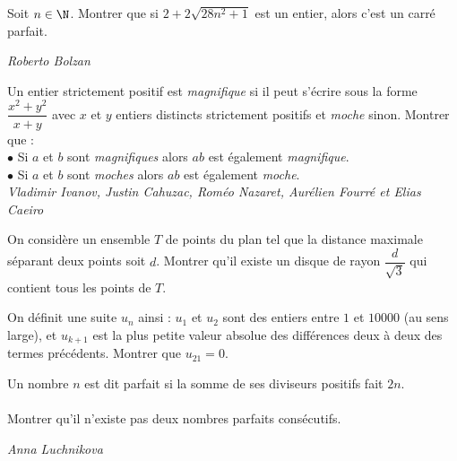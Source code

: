 \begin{exo}{}
Soit $n \in \N$. Montrer que si $2+2\sqrt{28n^2+1}$ est un entier, alors c'est un carré parfait.

\medskip
\textit{Roberto Bolzan}
\end{exo}



\begin{exo}{}
Un entier strictement positif est \textit{magnifique} si il peut s'écrire sous la forme $\dfrac{x^2+y^2}{x+y}$ avec $x$ et $y$ entiers distincts strictement positifs et \textit{moche} sinon. Montrer que :\\
$\bullet$ Si $a$ et $b$ sont \textit{magnifiques} alors $ab$ est également \textit{magnifique}.\\
$\bullet$ Si $a$ et $b$ sont \textit{moches} alors $ab$ est également \textit{moche}.\\

\medskip
\textit{Vladimir Ivanov, Justin Cahuzac, Roméo Nazaret, Aurélien Fourré et Elias Caeiro}

\end{exo}



\begin{exo}{}
On considère un ensemble $T$ de points du plan tel que la distance maximale séparant deux points soit $d$. Montrer qu'il existe un disque de rayon $\dfrac{d}{\sqrt{3}}$ qui contient tous les points de $T$.
\end{exo}




\begin{exo}{}On définit une suite $u_{n}$ ainsi : $u_{1}$ et $u_{2}$ sont des entiers entre $1$ et $10000$ (au sens large), et $u_{k+1}$
est la plus petite valeur absolue des différences deux à deux des termes précédents. Montrer que
$u_{21} = 0$.

\end{exo}


\begin{exo}{}
Un nombre $n$ est dit parfait si la somme de ses diviseurs positifs fait $2n$.\\~~\\
Montrer qu'il n'existe pas deux nombres parfaits consécutifs.

\medskip
\textit{Anna Luchnikova}

\end{exo}



